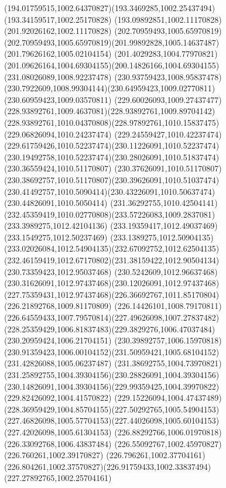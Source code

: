 {{	\curveto(194.01759515,1002.64370827)(193.3469285,1002.25437494)(193.34159517,1002.25170828)
	\lineto(193.09892851,1002.11170828)
	\lineto(201.92026162,1002.11170828)
	\lineto(202.70959493,1005.65970819)
	\curveto(202.70959493,1005.65970819)(201.99892828,1005.14637487)(201.79626162,1005.02104154)
	\curveto(201.4029283,1004.77970821)(201.09626164,1004.69304155)(200.14826166,1004.69304155)
	\moveto(231.08026089,1008.92237478)
	\curveto(230.93759423,1008.95837478)(230.7922609,1008.99304144)(230.64959423,1009.02770811)
	\lineto(230.60959423,1009.03570811)
	\curveto(229.60026093,1009.27437477)(228.93892761,1009.4637081)(228.93892761,1009.89704142)
	\curveto(228.93892761,1010.04370808)(228.97892761,1010.15837475)(229.06826094,1010.24237474)
	\curveto(229.24559427,1010.42237474)(229.61759426,1010.52237474)(230.11226091,1010.52237474)
	\curveto(230.19492758,1010.52237474)(230.28026091,1010.51837474)(230.36559424,1010.51170807)
	\curveto(230.37626091,1010.51170807)(230.38692757,1010.51170807)(230.39626091,1010.51037474)
	\curveto(230.41492757,1010.5090414)(230.43226091,1010.50637474)(230.44826091,1010.5050414)
	\curveto(231.36292755,1010.42504141)(232.45359419,1010.02770808)(233.57226083,1009.2837081)
	\lineto(233.3989275,1012.42104136)
	\lineto(233.19359417,1012.49037469)
	\lineto(233.1549275,1012.50237469)
	\curveto(233.1389275,1012.50904135)(233.02026084,1012.54904135)(232.67092752,1012.62504135)
	\curveto(232.46159419,1012.67170802)(231.38159422,1012.90504134)(230.73359423,1012.95037468)
	\curveto(230.5242609,1012.96637468)(230.31626091,1012.97437468)(230.12026091,1012.97437468)
	\curveto(227.75359431,1012.97437468)(226.36692767,1011.85170804)(226.21892768,1009.81170809)
	\curveto(226.14426101,1008.79170811)(226.64559433,1007.79570814)(227.49626098,1007.27837482)
	\curveto(228.25359429,1006.81837483)(229.3829276,1006.47037484)(230.20959424,1006.21704151)
	\lineto(230.39892757,1006.15970818)
	\curveto(230.91359423,1006.00104152)(231.50959421,1005.68104152)(231.42826088,1005.06237487)
	\curveto(231.38692755,1004.73970821)(231.25892755,1004.39304156)(230.28826091,1004.39304156)
	\curveto(230.14826091,1004.39304156)(229.99359425,1004.39970822)(229.82426092,1004.41570822)
	\curveto(229.15226094,1004.47437489)(228.36959429,1004.85704155)(227.50292765,1005.54904153)
	\curveto(227.46826098,1005.57704153)(227.44026098,1005.60104153)(227.42026098,1005.61304153)
	\lineto(226.88292766,1006.01970818)
	\lineto(226.33092768,1006.43837484)
	\lineto(226.55092767,1002.45970827)
	\lineto(226.760261,1002.39170827)
	\lineto(226.796261,1002.37704161)
	\curveto(226.804261,1002.37570827)(226.91759433,1002.33837494)(227.27892765,1002.25704161)
}}

